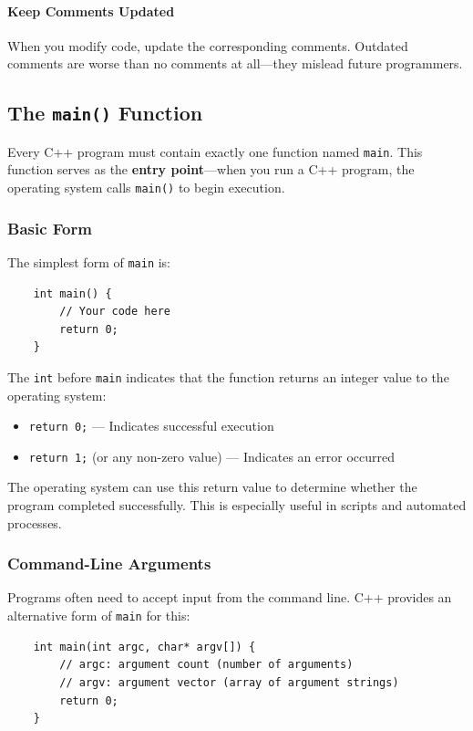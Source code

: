 \paragraph{Keep Comments Updated}

When you modify code, update the corresponding comments. Outdated comments are worse than no comments at all—they mislead future programmers.

\subsection{The \texttt{main()} Function}

Every C++ program must contain exactly one function named \texttt{main}. This function serves as the \textbf{entry point}—when you run a C++ program, the operating system calls \texttt{main()} to begin execution.

\subsubsection{Basic Form}

The simplest form of \texttt{main} is:

\begin{lstlisting}
	int main() {
		// Your code here
		return 0;
	}
\end{lstlisting}

The \texttt{int} before \texttt{main} indicates that the function returns an integer value to the operating system:
\begin{itemize}
	\item \texttt{return 0;} — Indicates successful execution
	\item \texttt{return 1;} (or any non-zero value) — Indicates an error occurred
\end{itemize}

The operating system can use this return value to determine whether the program completed successfully. This is especially useful in scripts and automated processes.

\subsubsection{Command-Line Arguments}

Programs often need to accept input from the command line. C++ provides an alternative form of \texttt{main} for this:

\begin{lstlisting}
	int main(int argc, char* argv[]) {
		// argc: argument count (number of arguments)
		// argv: argument vector (array of argument strings)
		return 0;
	}
\end{lstlisting}

